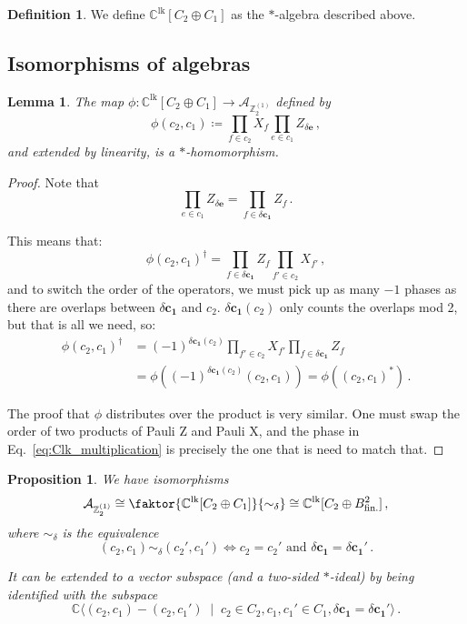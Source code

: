 \documentclass[aps,twocolumn,prx,floatfix,preprintnumbers, nofootinbib,10pt]{revtex4-2}
\numberwithin{equation}{section}
\newtheorem{proposition}[theorem]{Proposition}
\newtheorem{lemma}[theorem]{Lemma}
\theoremstyle{definition}
\newtheorem{definition}[theorem]{Definition}
\theoremstyle{remark}
\theoremstyle{claim}
\newcommand{\be}{\begin{equation}}
\newcommand{\ee}{\end{equation}}
\newcommand{\Z}{{\mathbb Z}}
\newcommand{\mc}[1]{\mathcal{#1}}
\newcommand{\paren}[1]{\left( #1 \right)}
\begin{document}
\begin{definition}
 We define $\mathbb{C}^\text{lk}[C_2 \oplus C_1]$ as the $*$-algebra described above.
\end{definition}

\subsection{Isomorphisms of algebras}

\begin{lemma}
 The map $\phi : \mathbb{C}^\text{lk}[C_2 \oplus C_1] \rightarrow \mc{A}_{\Z_2^{(1)}}$ defined by
 \be
 \phi(c_2, c_1) \coloneqq \prod_{f \in c_2} X_f \prod_{e \in c_1} Z_{\delta \bm{e}} \,,
 \ee
 and extended by linearity, is a $*$-homomorphism.
\end{lemma}

\begin{proof}
 Note that
 \be
 \prod_{e \in c_1} Z_{\delta \bm{e}} = \prod_{f \in \delta \bm{c_1}} Z_f \,.
 \ee

 This means that:
 \be
 \phi(c_2, c_1)^\dag = \prod_{f \in \delta \bm{c_1}} Z_f \prod_{f' \in c_2} X_{f'} \,,
 \ee
 and to switch the order of the operators, we must pick up as many $-1$ phases as there are overlaps between $\delta \bm{c_1}$ and $c_2$. $\delta \bm{c_1}(c_2)$ only counts the overlaps mod 2, but that is all we need, so:
 \begin{align}
  \phi(c_2, c_1)^\dag &= (-1)^{\delta \bm{c_1}(c_2)} \prod_{f' \in c_2} X_{f'} \prod_{f \in \delta \bm{c_1}} Z_f \nonumber \\
  &= \phi \paren{ (-1)^{\delta \bm{c_1}(c_2)} (c_2, c_1) } = \phi\paren{ (c_2, c_1)^{*} } \,.
 \end{align}

 The proof that $\phi$ distributes over the product is very similar. One must swap the order of two products of Pauli Z and Pauli X, and the phase in Eq.~\eqref{eq:Clk_multiplication} is precisely the one that is need to match that.
\end{proof}

\begin{proposition}\label{prop:isomorphisms1}
 We have isomorphisms
 \be
 \mc{A}_{\Z_2^{(1)}} \cong \faktor{\mathbb{C}^\text{lk}[C_2 \oplus C_1]}{\sim_\delta} \cong \mathbb{C}^\text{lk}[C_2 \oplus B^2_\text{fin.}] \,,
 \ee
 where $\sim_\delta$ is the equivalence
 \be
 (c_2, c_1) \sim_\delta (c_2', c_1') \iff c_2 = c_2' \text{ and } \delta \bm{c_1} = \delta \bm{c_1'} \,.
 \ee

 It can be extended to a vector subspace (and a two-sided $*$-ideal) by being identified with the subspace
 \be
 \mathbb{C}\big\langle (c_2, c_1) - (c_2, c_1') \; \mid \; c_2 \in C_2, c_1, c_1' \in C_1,  \delta \bm{c_1} = \delta \bm{c_1'} \big\rangle \,.
 \ee
\end{proposition}
\end{document}
